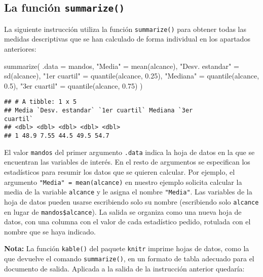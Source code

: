 \documentclass[
  degree=mecinf,
  title=normal,
  toc=normal,
  bib=normal]{mnye}
\newenvironment{Shaded}{\begin{snugshade}}{\end{snugshade}}
\newcommand{\AttributeTok}[1]{\textcolor[rgb]{0.77,0.63,0.00}{#1}}
\newcommand{\FloatTok}[1]{\textcolor[rgb]{0.00,0.00,0.81}{#1}}
\newcommand{\FunctionTok}[1]{\textcolor[rgb]{0.00,0.00,0.00}{#1}}
\newcommand{\NormalTok}[1]{#1}
\newcommand{\OtherTok}[1]{\textcolor[rgb]{0.56,0.35,0.01}{#1}}
\newcommand{\StringTok}[1]{\textcolor[rgb]{0.31,0.60,0.02}{#1}}
\begin{document}
\hypertarget{summarize}{%
\subsection{\texorpdfstring{La función \texttt{summarize()}}{La función summarize()}}\label{summarize}}

La siguiente instrucción utiliza la función \texttt{summarize()} para obtener todas las medidas descriptivas que se han calculado de forma individual en los apartados anteriores:

\begin{Shaded}
\begin{Highlighting}[]
\FunctionTok{summarize}\NormalTok{(}
    \AttributeTok{.data =}\NormalTok{ mandos, }
    \StringTok{"Media"} \OtherTok{=} \FunctionTok{mean}\NormalTok{(alcance), }
    \StringTok{"Desv. estandar"} \OtherTok{=} \FunctionTok{sd}\NormalTok{(alcance),}
    \StringTok{"1er cuartil"} \OtherTok{=} \FunctionTok{quantile}\NormalTok{(alcance, }\FloatTok{0.25}\NormalTok{),}
    \StringTok{"Mediana"} \OtherTok{=} \FunctionTok{quantile}\NormalTok{(alcance, }\FloatTok{0.5}\NormalTok{),}
    \StringTok{"3er cuartil"} \OtherTok{=} \FunctionTok{quantile}\NormalTok{(alcance, }\FloatTok{0.75}\NormalTok{)}
\NormalTok{)}
\end{Highlighting}
\end{Shaded}

\begin{verbatim}
## # A tibble: 1 x 5
## Media `Desv. estandar` `1er cuartil` Mediana `3er
cuartil`
## <dbl> <dbl> <dbl> <dbl> <dbl>
## 1 48.9 7.55 44.5 49.5 54.7
\end{verbatim}

El valor \texttt{mandos} del primer argumento \texttt{.data} indica la hoja de datos en la que se encuentran las variables de interés. En el resto de argumentos se especifican los estadísticos para resumir los datos que se quieren calcular. Por ejemplo, el argumento \texttt{"Media"\ =\ mean(alcance)} en nuestro ejemplo solicita calcular la media de la variable \texttt{alcance} y le asigna el nombre \texttt{"Media"}. Las variables de la hoja de datos pueden usarse escribiendo solo su nombre (escribiendo solo \texttt{alcance} en lugar de \texttt{mandos\$alcance}). La salida se organiza como una nueva hoja de datos, con una columna con el valor de cada estadístico pedido, rotulada con el nombre que se haya indicado.

\textbf{Nota:} La función \texttt{kable()} del paquete \texttt{knitr} imprime hojas de datos, como la que devuelve el comando \texttt{summarize()}, en un formato de tabla adecuado para el documento de salida. Aplicada a la salida de la instrucción anterior quedaría:
\end{document}
